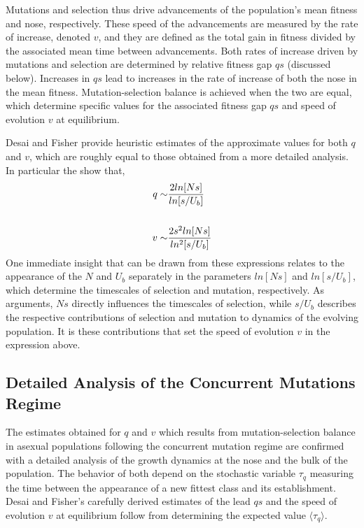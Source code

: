 \documentclass[12pt]{article}
\begin{document}
Mutations and selection thus drive advancements of the population's mean fitness and nose, respectively.  These speed of the advancements are measured by the rate of increase, denoted $v$, and they are defined as the total gain in fitness divided by the associated mean time between advancements.  Both rates of increase driven by mutations and selection are determined by relative fitness gap $qs$ (discussed below).  Increases in $qs$ lead to increases in the rate of increase of both the nose in the mean fitness.  Mutation-selection balance is achieved when the two are equal, which determine specific values for the associated fitness gap $qs$ and speed of evolution $v$ at equilibrium. 

Desai and Fisher provide heuristic estimates of the approximate values for both $q$ and $v$, which are roughly equal to those obtained from a more detailed analysis.  In particular the show that,
\begin{equation}
\begin{aligned}
q \sim & {2ln[Ns] \over ln[s/U_b]} \\   
\\
v \sim & {2s^2ln[Ns] \over ln^2[s/U_b]}
\end{aligned}
\end{equation}
One immediate insight that can be drawn from these expressions relates to the appearance of the $N$ and $U_b$ separately in the parameters $ln[Ns]$ and $ln[s/U_b]$, which determine the timescales of selection and mutation, respectively.  As arguments, $Ns$ directly influences the timescales of selection, while $s/U_b$ describes the respective contributions of selection and mutation to dynamics of the evolving population.  It is these contributions that set the speed of evolution $v$ in the expression above.   

\subsection*{Detailed Analysis of the Concurrent Mutations Regime}
The estimates obtained for $q$ and $v$ which results from mutation-selection balance in asexual populations following the concurrent mutation regime are confirmed with a detailed analysis of the growth dynamics at the nose and the bulk of the population.  The behavior of both depend on the stochastic variable $\tau_q$ measuring the time between the appearance of a new fittest class and its establishment.  Desai and Fisher's carefully derived estimates of the lead $qs$ and the speed of evolution $v$ at equilibrium follow from determining the expected value $\langle \tau_q \rangle$.   
\end{document}
